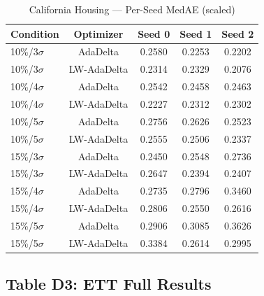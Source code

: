 \documentclass[11pt,a4paper]{article}
\begin{document}
\begin{table}[H]
\centering
\caption{California Housing --- Per-Seed MedAE (scaled)}
\label{tab:perseed-california}
\begin{tabular}{lcccc}
\toprule
\textbf{Condition} & \textbf{Optimizer} & \textbf{Seed 0} & \textbf{Seed 1} & \textbf{Seed 2} \\
\midrule
10\%/3$\sigma$ & AdaDelta & 0.2580 & 0.2253 & 0.2202 \\
10\%/3$\sigma$ & LW-AdaDelta & 0.2314 & 0.2329 & 0.2076 \\
10\%/4$\sigma$ & AdaDelta & 0.2542 & 0.2458 & 0.2463 \\
10\%/4$\sigma$ & LW-AdaDelta & 0.2227 & 0.2312 & 0.2302 \\
10\%/5$\sigma$ & AdaDelta & 0.2756 & 0.2626 & 0.2523 \\
10\%/5$\sigma$ & LW-AdaDelta & 0.2555 & 0.2506 & 0.2337 \\
15\%/3$\sigma$ & AdaDelta & 0.2450 & 0.2548 & 0.2736 \\
15\%/3$\sigma$ & LW-AdaDelta & 0.2647 & 0.2394 & 0.2407 \\
15\%/4$\sigma$ & AdaDelta & 0.2735 & 0.2796 & 0.3460 \\
15\%/4$\sigma$ & LW-AdaDelta & 0.2806 & 0.2550 & 0.2616 \\
15\%/5$\sigma$ & AdaDelta & 0.2906 & 0.3085 & 0.3626 \\
15\%/5$\sigma$ & LW-AdaDelta & 0.3384 & 0.2614 & 0.2995 \\
\bottomrule
\end{tabular}
\end{table}

\subsection*{Table D3: ETT Full Results}
\end{document}
